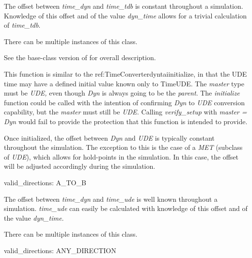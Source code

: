 {\begin{enumerate}
{\begin{enumerate}
The offset between \textit{time\_dyn} and
\textit{time\_tdb} is constant throughout a simulation.
Knowledge of this
offset and of the value \textit{dyn\_time} allows for a trivial calculation of
\textit{time\_tdb}.




\end{enumerate}}



There can be multiple instances of this class.

{\begin{enumerate}
See the base-class version of
 for overall description.

This function is similar to the 
{ref:TimeConverterdyntaiinitialize},
in that the UDE time may have a defined initial value known only to
TimeUDE.  The \textit{master} type must be \textit{UDE, }even though
\textit{Dyn} is always going to be the \textit{parent}.  The
\textit{initialize} function could be called with the intention of
confirming \textit{Dyn} to \textit{UDE} conversion capability, but the
\textit{master} must still be \textit{UDE.  }Calling
\textit{verify\_setup} with\textit{ master = Dyn }would fail to provide
the protection that this function is intended to provide.

Once initialized, the offset between \textit{Dyn} and \textit{UDE} is
typically constant throughout the simulation.  The exception to this is
the case of a \textit{MET }(subclass of \textit{UDE}), which allows
for hold-points in the simulation.  In this case, the offset will be
adjusted accordingly during the simulation.

valid\_directions:
A\_TO\_B

The offset between \textit{time\_dyn }and
\textit{time\_ude }is well known throughout a simulation.
\textit{time\_ude} can easily be calculated with knowledge of this
offset and of the value \textit{dyn\_time.}

\end{enumerate}}


There can be multiple instances of this class.

{\begin{enumerate}
valid\_directions:
ANY\_DIRECTION


\end{enumerate}}
\end{enumerate}}

